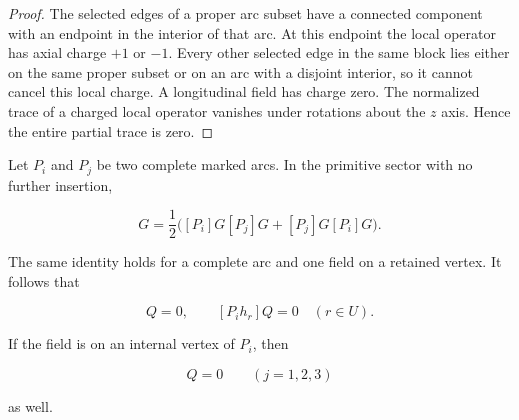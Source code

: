 \begin{proof}
The selected edges of a proper arc subset have a connected component with an
endpoint in the interior of that arc.  At this endpoint the local operator
has axial charge $+1$ or $-1$.  Every other selected edge in the same block
lies either on the same proper subset or on an arc with a disjoint interior,
so it cannot cancel this local charge.  A longitudinal field has charge zero.
The normalized trace of a charged local operator vanishes under rotations
about the $z$ axis.  Hence the entire partial trace is zero.
\end{proof}

\begin{lemma}
\label{lem:pairwise-shuffle}
Let $P_i$ and $P_j$ be two complete marked arcs.  In the primitive sector
with no further insertion,

\begin{equation}
 [P_iP_j]G
 =\frac12\bigl([P_i]G[P_j]G+[P_j]G[P_i]G\bigr).
 \label{eq:two-arc-shuffle}
\end{equation}

The same identity holds for a complete arc and one field on a retained
vertex.  It follows that

\begin{equation}
 [P_iP_j]Q=0,
 \qquad
 [P_i h_r]Q=0
 \quad(r\in U).
 \label{eq:pair-jets-zero}
\end{equation}

If the field is on an internal vertex of $P_i$, then

\begin{equation}
 [P_j h_r]Q=0
 \qquad(j=1,2,3)
 \label{eq:internal-field-pair-zero}
\end{equation}

as well.
\end{lemma}

